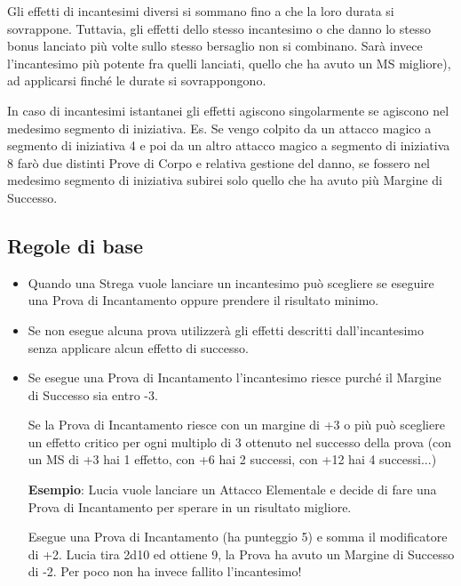 \documentclass[12pt,a4paper,twoside,openany]{book}
\begin{document}
\begin{multicols}{2}
Gli effetti di incantesimi diversi si sommano fino a che la loro durata si sovrappone. Tuttavia, gli effetti dello stesso incantesimo o che danno lo stesso bonus lanciato più volte sullo stesso bersaglio non si combinano. Sarà invece l'incantesimo più potente fra quelli lanciati, quello che ha avuto un MS migliore), ad applicarsi finché le durate si sovrappongono.

In caso di incantesimi istantanei gli effetti agiscono singolarmente se agiscono nel medesimo segmento di iniziativa. Es. Se vengo colpito da un attacco magico a segmento di iniziativa 4 e poi da un altro attacco magico a segmento di iniziativa 8 farò due distinti Prove di Corpo e relativa gestione del danno, se fossero nel medesimo segmento di iniziativa subirei solo quello che ha avuto più Margine di Successo.

\subsection{Regole di base}\label{magieregoledibase}


\begin{itemize}

\item 
Quando una Strega vuole lanciare un incantesimo può scegliere se eseguire una Prova di Incantamento oppure prendere il risultato minimo.

\item 
Se non esegue alcuna prova utilizzerà gli effetti descritti dall'incantesimo senza applicare alcun effetto di successo.

\item 
Se esegue una Prova di Incantamento l'incantesimo riesce purché il Margine di Successo sia entro -3.

Se la Prova di Incantamento riesce con un margine di +3 o più può scegliere un effetto critico per ogni multiplo di 3 ottenuto nel successo della prova (con un MS di +3 hai 1 effetto, con +6 hai 2 successi, con +12 hai 4 successi...)

\textbf{Esempio}: Lucia vuole lanciare un Attacco Elementale e decide di fare una Prova di Incantamento per sperare in un risultato migliore.

Esegue una Prova di Incantamento (ha punteggio 5) e somma il modificatore di +2.
Lucia tira 2d10 ed ottiene 9, la Prova ha avuto un Margine di Successo di -2. Per poco non ha invece fallito l'incantesimo!


\end{itemize}
\end{multicols}
\end{document}
